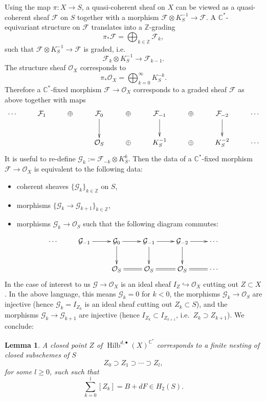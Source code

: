 \documentclass{amsart}
\newtheorem{lemma}[theorem]{Lemma}
\theoremstyle{definition}
\newcommand{\CC} {\mathbb{C}}          %
\newcommand{\ZZ} {\mathbb{Z}}		%
\renewcommand{\O}{\mathcal{O}}
\newcommand{\Hilb}{\operatorname{Hilb}}
\newcommand{\F}{\mathcal{F}}
\newcommand{\G}{\mathcal{G}}
\begin{document}
Using the map $\pi : X \rightarrow S$, a quasi-coherent sheaf on $X$ can be viewed as a quasi-coherent sheaf $\F$ on $S$ together with a morphism $\F \otimes K_{S}^{-1} \rightarrow \F$. A $\CC^*$-equivariant structure on $\F$ translates into a $\ZZ$-grading
$$
\pi_* \F = \bigoplus_{k \in \ZZ} \F_k,
$$
such that $\F \otimes K_{S}^{-1} \rightarrow \F$ is graded, i.e.
$$
\F_k \otimes K_{S}^{-1} \longrightarrow \F_{k-1}.
$$
The structure sheaf $\O_X$ corresponds to 
$$
\pi_* \O_X = \bigoplus_{k=0}^{\infty} K_{S}^{-k}.
$$
Therefore a $\CC^*$-fixed morphism $\F \rightarrow \O_X$ corresponds to a graded sheaf $\F$ as above together with maps
\begin{displaymath}
\xymatrix
{
\cdots & \F_1 & \oplus & \F_0 \ar[d] & \oplus & \F_{-1} \ar[d] & \oplus & \F_{-2} \ar[d] & \cdots \\
& & & \O_S & \oplus & K_{S}^{-1} & \oplus & K_{S}^{-2} & \cdots 
}
\end{displaymath}
It is useful to re-define $\G_k := \F_{-k} \otimes K_{S}^{k}$. Then the data of a $\CC^*$-fixed morphism $\F \rightarrow \O_X$ is equivalent to the following data:
\begin{itemize}
\item coherent sheaves $\{\G_k\}_{k \in \ZZ}$ on $S$,
\item morphisms $\{\G_k \rightarrow \G_{k+1}\}_{k \in \ZZ}$,
\item morphisms $\G_k \rightarrow \O_S$ such that the following diagram commutes:
\end{itemize}
\begin{displaymath}
\xymatrix
{
\cdots & \G_{-1} \ar[r] & \G_0 \ar[r] \ar[d] & \G_{-1} \ar[r] \ar[d] & \G_{-2} \ar[r] \ar[d] & \cdots \\
& & \O_S \ar@{=}[r]& \O_S \ar@{=}[r] & \O_S \ar@{=}[r] & \cdots 
}
\end{displaymath}
In the case of interest to us $\G \rightarrow \O_X$ is an ideal sheaf $I_Z \hookrightarrow \O_X$ cutting out $Z \subset X$. In the above language, this means $\G_k = 0$ for $k<0$, the morphisms $\G_k \rightarrow \O_S$ are injective (hence $\G_k = I_{Z_k}$ is an ideal sheaf cutting out $Z_k \subset S$), and the morphisms $\G_k \rightarrow \G_{k+1}$ are injective (hence $I_{Z_k} \subset I_{Z_{k+1}}$, i.e.~$Z_{k} \supset Z_{k+1}$). We conclude:
\begin{lemma}
A closed point $Z$ of $\Hilb^{d,\bullet}(X)^{\CC^*}$ corresponds to a finite nesting of closed subschemes of $S$
$$
Z_{0} \supset Z_{1} \supset \cdots \supset Z_{l},
$$
for some $l \geq 0$, such such that
$$
\sum_{k=0}^{l} [Z_k] = B + dF \in H_2(S).
$$
\end{lemma}
\end{document}
